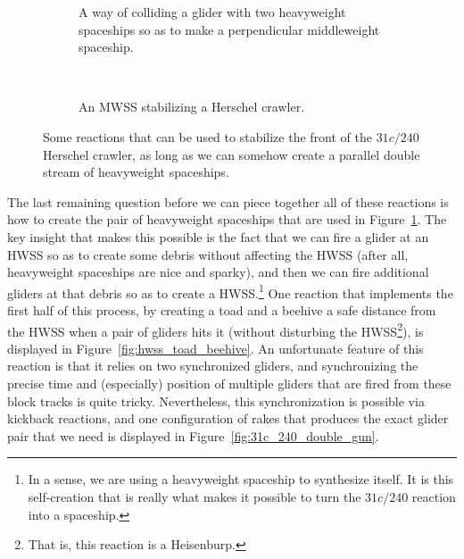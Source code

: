 \begin{figure}[!htb]
	\centering
	\begin{subfigure}[b]{0.43\textwidth}
		\centering
		\caption{A way of colliding a glider with two heavyweight spaceships so as to make a perpendicular middleweight spaceship.}\label{fig:g_2h_to_m}
	\end{subfigure} \ \	\ \ \begin{subfigure}[b]{0.53\textwidth}
		\centering
		\caption{An MWSS stabilizing a Herschel crawler.}\label{fig:herschel_mwss_stabilize}
	\end{subfigure}
	\caption{Some reactions that can be used to stabilize the front of the $31c/240$ Herschel crawler, as long as we can somehow create a parallel double stream of heavyweight spaceships.}\label{fig:silverfish_mwss_reactions}
\end{figure}

The last remaining question before we can piece together all of these reactions is how to create the pair of heavyweight spaceships that are used in Figure~\ref{fig:g_2h_to_m}. The key insight that makes this possible is the fact that we can fire a glider at an HWSS so as to create some debris without affecting the HWSS (after all, heavyweight spaceships are nice and sparky), and then we can fire additional gliders at that debris so as to create a HWSS.\footnote{In a sense, we are using a heavyweight spaceship to synthesize itself. It is this self-creation that is really what makes it possible to turn the $31c/240$ reaction into a spaceship.} One reaction that implements the first half of this process, by creating a toad and a beehive a safe distance from the HWSS when a pair of gliders hits it (without disturbing the HWSS\footnote{That is, this reaction is a Heisenburp.}), is displayed in Figure~\ref{fig:hwss_toad_beehive}. An unfortunate feature of this reaction is that it relies on two synchronized gliders, and synchronizing the precise time and (especially) position of multiple gliders that are fired from these block tracks is quite tricky. Nevertheless, this synchronization is possible via kickback reactions, and one configuration of rakes that produces the exact glider pair that we need is displayed in Figure~\ref{fig:31c_240_double_gun}.

